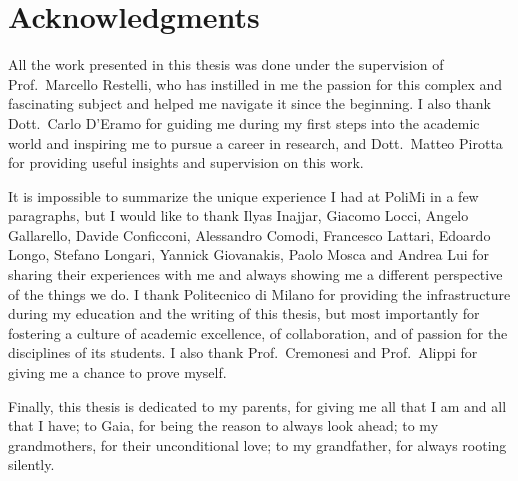 \chapter*{Acknowledgments}


All the work presented in this thesis was done under the supervision of 
Prof.\ Marcello Restelli, who has instilled in me the passion for this complex 
and fascinating subject and helped me navigate it since the beginning. 
I also thank Dott.\ Carlo D'Eramo for guiding me during my first steps into the 
academic world and inspiring me to pursue a career in research, and 
Dott.\ Matteo Pirotta for providing useful insights and supervision on this work.

It is impossible to summarize the unique experience I had at PoliMi in a few
paragraphs, but I would like to thank Ilyas Inajjar, Giacomo Locci, Angelo 
Gallarello, Davide Conficconi, Alessandro Comodi, Francesco Lattari, Edoardo
Longo, Stefano Longari, Yannick Giovanakis, Paolo Mosca and Andrea Lui for 
sharing their experiences with me and always showing me a different perspective
of the things we do. 
I thank Politecnico di Milano for providing the infrastructure during my 
education and the writing of this thesis, but most importantly for fostering a 
culture of academic excellence, of collaboration, and of passion for the 
disciplines of its students.
I also thank Prof.\ Cremonesi and Prof.\ Alippi for giving me a chance to prove 
myself.

Finally, this thesis is dedicated to my parents, for giving me all that I am and
all that I have; 
to Gaia, for being the reason to always look ahead;
to my grandmothers, for their unconditional love; 
to my grandfather, for always rooting silently.
